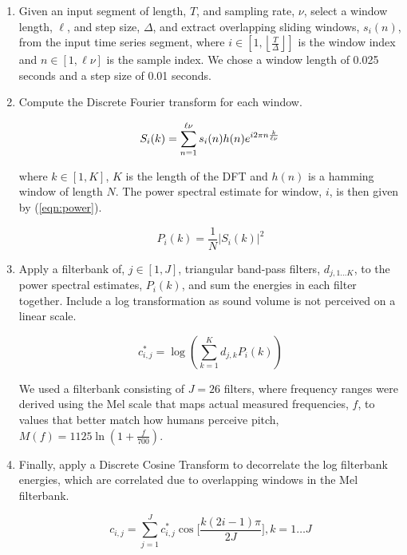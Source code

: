 \documentclass{article}
\begin{document}
\begin{enumerate}

\item Given an input segment of length, $T$, and sampling rate, $\nu$, select a window length, $\ell$, and step size, $\Delta$, and extract overlapping sliding windows, $s_i(n)$, from the input time series segment, where $i \in [1, \left \lfloor{\frac{T}{\Delta}}\right \rfloor] $ is the window index and $n \in [1, \ell\nu]$ is the sample index. We chose a window length of 0.025 seconds and a step size of 0.01 seconds.

\item Compute the Discrete Fourier transform for each window.

\begin{equation}
S_i(k) = \sum\limits_{n=1}^{\ell\nu}{s_i(n)h(n)e^{\-i2\pi n \frac{k}{\ell\nu}}}
\end{equation}

where $k \in [1, K]$, $K$ is the length of the DFT and $h(n)$ is a hamming window of length $N$. The power spectral estimate for window, $i$, is then given by (\ref{eqn:power}).

\begin{equation}
\label{eqn:power}
P_i(k) = \frac{1}{N}|S_i(k)|^2
\end{equation}

\item Apply a filterbank of, $j \in [1, J]$, triangular band-pass filters, $d_{j,1 \ldots K}$, to the power spectral estimates, $P_i(k)$, and sum the energies in each filter together. Include a log transformation as sound volume is not perceived on a linear scale.

\begin{equation}
c^*_{i,j} = \log(\sum\limits_{k=1}^{K}d_{j,k}P_i(k))
\end{equation}

We used a filterbank consisting of $J = 26$ filters, where frequency ranges were derived using the Mel scale that maps actual measured frequencies, $f$, to values that better match how humans perceive pitch, $M(f) = 1125 \ln (1 + \frac{f}{700})$.

\item Finally, apply a Discrete Cosine Transform to decorrelate the log filterbank energies, which are correlated due to overlapping windows in the Mel filterbank.

\begin{equation}
c_{i,j} = \sum\limits_{j=1}^{J}{c^*_{i,j}}\cos\Big[\frac{k(2i - 1)\pi}{2J}\Big], k = 1 \ldots J
\end{equation}


\end{enumerate}
\end{document}
